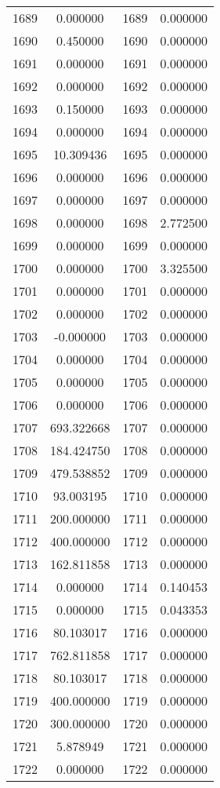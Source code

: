 \documentclass[12pt]{article}
\begin{document}
\begin{longtable}{@{}cccc@{}}
1689 & 0.000000 & 1689 & 0.000000 \\
1690 & 0.450000 & 1690 & 0.000000 \\
1691 & 0.000000 & 1691 & 0.000000 \\
1692 & 0.000000 & 1692 & 0.000000 \\
1693 & 0.150000 & 1693 & 0.000000 \\
1694 & 0.000000 & 1694 & 0.000000 \\
1695 & 10.309436 & 1695 & 0.000000 \\
1696 & 0.000000 & 1696 & 0.000000 \\
1697 & 0.000000 & 1697 & 0.000000 \\
1698 & 0.000000 & 1698 & 2.772500 \\
1699 & 0.000000 & 1699 & 0.000000 \\
1700 & 0.000000 & 1700 & 3.325500 \\
1701 & 0.000000 & 1701 & 0.000000 \\
1702 & 0.000000 & 1702 & 0.000000 \\
1703 & -0.000000 & 1703 & 0.000000 \\
1704 & 0.000000 & 1704 & 0.000000 \\
1705 & 0.000000 & 1705 & 0.000000 \\
1706 & 0.000000 & 1706 & 0.000000 \\
1707 & 693.322668 & 1707 & 0.000000 \\
1708 & 184.424750 & 1708 & 0.000000 \\
1709 & 479.538852 & 1709 & 0.000000 \\
1710 & 93.003195 & 1710 & 0.000000 \\
1711 & 200.000000 & 1711 & 0.000000 \\
1712 & 400.000000 & 1712 & 0.000000 \\
1713 & 162.811858 & 1713 & 0.000000 \\
1714 & 0.000000 & 1714 & 0.140453 \\
1715 & 0.000000 & 1715 & 0.043353 \\
1716 & 80.103017 & 1716 & 0.000000 \\
1717 & 762.811858 & 1717 & 0.000000 \\
1718 & 80.103017 & 1718 & 0.000000 \\
1719 & 400.000000 & 1719 & 0.000000 \\
1720 & 300.000000 & 1720 & 0.000000 \\
1721 & 5.878949 & 1721 & 0.000000 \\
1722 & 0.000000 & 1722 & 0.000000 \\

\end{longtable}
\end{document}
